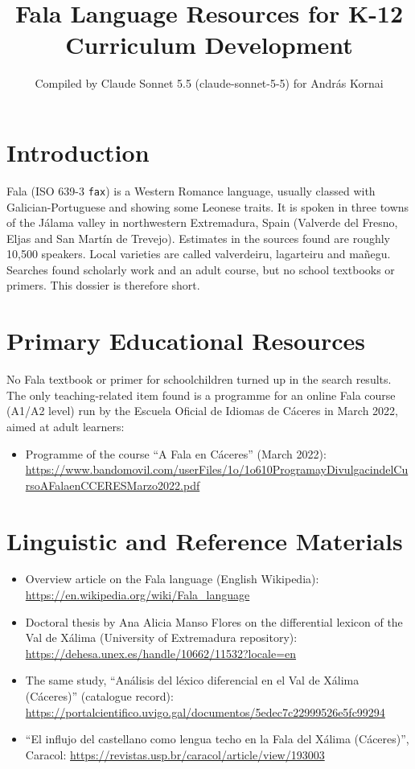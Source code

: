 \documentclass[12pt]{article}
\title{Fala Language Resources for K-12 Curriculum Development}
\author{Compiled by Claude Sonnet 5.5 (claude-sonnet-5-5) for Andr\'as Kornai}
\date{}
\begin{document}
\maketitle

\section{Introduction}
Fala (ISO 639-3 \texttt{fax}) is a Western Romance language, usually classed with Galician-Portuguese and showing some Leonese traits. It is spoken in three towns of the Jálama valley in northwestern Extremadura, Spain (Valverde del Fresno, Eljas and San Martín de Trevejo). Estimates in the sources found are roughly 10,500 speakers. Local varieties are called valverdeiru, lagarteiru and mañegu. Searches found scholarly work and an adult course, but no school textbooks or primers. This dossier is therefore short.

\section{Primary Educational Resources}
No Fala textbook or primer for schoolchildren turned up in the search results. The only teaching-related item found is a programme for an online Fala course (A1/A2 level) run by the Escuela Oficial de Idiomas de C\'aceres in March 2022, aimed at adult learners:
\begin{itemize}
\item Programme of the course ``A Fala en C\'aceres'' (March 2022): \url{https://www.bandomovil.com/userFiles/1o/1o610ProgramayDivulgacindelCursoAFalaenCCERESMarzo2022.pdf}
\end{itemize}

\section{Linguistic and Reference Materials}
\begin{itemize}
\item Overview article on the Fala language (English Wikipedia): \url{https://en.wikipedia.org/wiki/Fala_language}
\item Doctoral thesis by Ana Alicia Manso Flores on the differential lexicon of the Val de Xálima (University of Extremadura repository): \url{https://dehesa.unex.es/handle/10662/11532?locale=en}
\item The same study, ``An\'alisis del l\'exico diferencial en el Val de X\'alima (C\'aceres)'' (catalogue record): \url{https://portalcientifico.uvigo.gal/documentos/5edec7c22999526e5fc99294}
\item ``El influjo del castellano como lengua techo en la Fala del X\'alima (C\'aceres)'', Caracol: \url{https://revistas.usp.br/caracol/article/view/193003}
\end{itemize}
\end{document}
